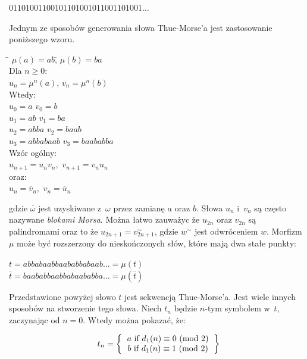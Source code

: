 \documentclass[document]{xmgr}
\begin{document}
{\centering $01101001100101101001011001101001\ldots$ \par}

\noindent Jednym ze sposobów generowania słowa Thue-Morse'a jest zastosowanie poniższego wzoru.

\begin{tabbing}

\hspace{8em}\= $\mu(a) = ab$,\hspace{7em}\= $\mu(b) = ba$\\
Dla $n \geq 0$:\\
\> $u_n = \mu^n(a)$,\> $v_n = \mu^n(b)$\\
Wtedy:\\
\> $u_0 = a$ \> $v_0 = b$\\
\> $u_1 = ab$ \> $v_1 = ba$\\
\> $u_2 = abba$	 \> $v_2 = baab$\\
\> $u_3 = abbabaab$ \> $v_3 = baababba$\\
Wzór ogólny:\\
\> $u_{n+1} = u_n v_n,$ \> $v_{n+1} = v_n u_n$\\
oraz:\\
\> $u_n = \overline{v}_n,$ \> $v_n = \overline{u}_n$
\end{tabbing}

gdzie $\overline{\omega}$ jest uzyskiwane z~$\omega$ przez zamianę $a$ oraz $b$. Słowa $u_n$ i~$v_n$ są często nazywane \emph{blokami Morsa}. Można łatwo zauważyc że $u_{2n}$ oraz $v_{2n}$ są palindromami oraz to że $u_{2n+1} =  v^{\sim}_{2n+1}$, gdzie $w^{\sim}$ jest odwróceniem $w$. Morfizm $\mu$ może być rozszerzony do nieskończonych słów, które mają dwa stałe punkty:

{\centering 
$t = abbabaabbaababbabaab\ldots = \mu(t)$ \\
$ \overline{t} = baababbaabbabaababba\ldots = \mu(\overline{t})$
\par}

\noindent Przedstawione powyżej słowo $t$ jest sekwencją Thue-Morse'a. Jest wiele innych sposobów na stworzenie tego słowa. Niech $t_n$ będzie $n$-tym symbolem w~$t$, zaczynając od $n=0$. Wtedy można pokazać, że:

\[
t_n=
\left \{
\begin{tabular}{ccc}
$a$\ if$\ d_1(n) \equiv 0$ (mod $2$) \\
$b$\ if$\ d_1(n) \equiv 1$ (mod $2$)
\end{tabular}
\right \}
\]
\end{document}
